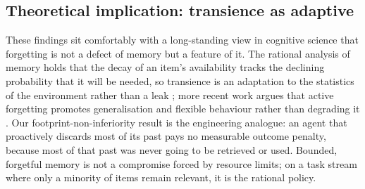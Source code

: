 \subsection{Theoretical implication: transience as adaptive}

These findings sit comfortably with a long-standing view in cognitive science that
forgetting is not a defect of memory but a feature of it. The rational analysis of
memory holds that the decay of an item's availability tracks the declining
probability that it will be needed, so transience is an adaptation to the statistics
of the environment rather than a leak \cite{anderson1991}; more recent work argues
that active forgetting promotes generalisation and flexible behaviour rather than
degrading it \cite{richards2017}. Our footprint-non-inferiority result is the
engineering analogue: an agent that proactively discards most of its past pays no
measurable outcome penalty, because most of that past was never going to be
retrieved or used. Bounded, forgetful memory is not a compromise forced by resource
limits; on a task stream where only a minority of items remain relevant, it is the
rational policy.
